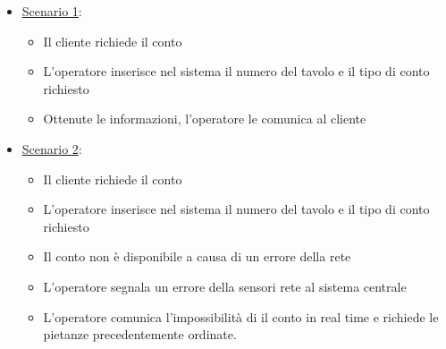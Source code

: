 \begin{enumerate}
\begin{itemize}
        \begin{itemize}
            \item \uline{Scenario 1}:
            \begin{itemize}
                \item Il cliente richiede il conto
                \item L'operatore inserisce nel sistema il numero del tavolo e il 
                    tipo di conto richiesto
                \item Ottenute le informazioni, l'operatore le comunica al cliente
            \end{itemize}
            \item \uline{Scenario 2}:
            \begin{itemize}
                \item Il cliente richiede il conto
                \item L'operatore inserisce nel sistema il numero del tavolo e il 
                    tipo di conto richiesto
                \item Il conto non \`e disponibile a causa di un errore della rete
                \item L'operatore segnala un errore della sensori rete al sistema centrale
                \item L'operatore comunica l'impossibilit\`a di il conto in real time e richiede
                    le pietanze precedentemente ordinate.
            \end{itemize}
        \end{itemize}
    \end{itemize}
\end{enumerate}
            

